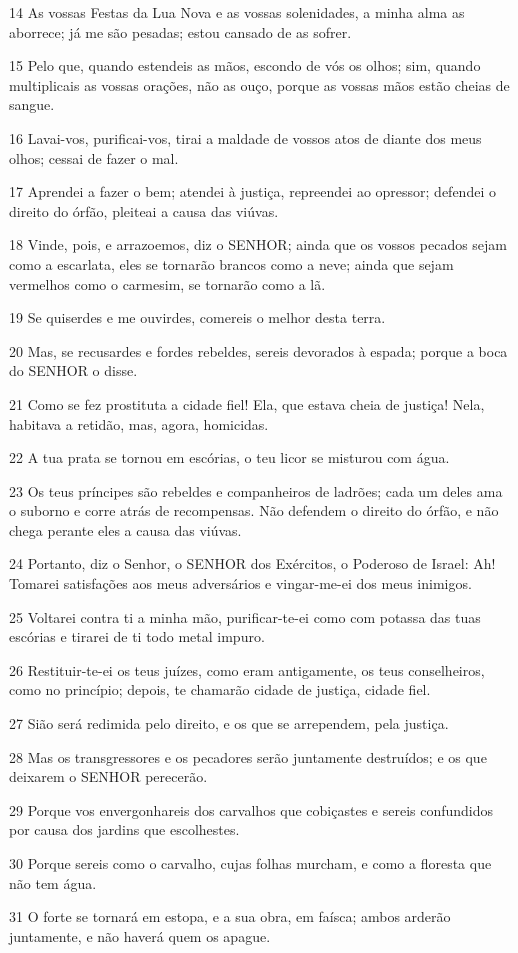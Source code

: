 \par 14 As vossas Festas da Lua Nova e as vossas solenidades, a minha alma as aborrece; já me são pesadas; estou cansado de as sofrer.
\par 15 Pelo que, quando estendeis as mãos, escondo de vós os olhos; sim, quando multiplicais as vossas orações, não as ouço, porque as vossas mãos estão cheias de sangue.
\par 16 Lavai-vos, purificai-vos, tirai a maldade de vossos atos de diante dos meus olhos; cessai de fazer o mal.
\par 17 Aprendei a fazer o bem; atendei à justiça, repreendei ao opressor; defendei o direito do órfão, pleiteai a causa das viúvas.
\par 18 Vinde, pois, e arrazoemos, diz o SENHOR; ainda que os vossos pecados sejam como a escarlata, eles se tornarão brancos como a neve; ainda que sejam vermelhos como o carmesim, se tornarão como a lã.
\par 19 Se quiserdes e me ouvirdes, comereis o melhor desta terra.
\par 20 Mas, se recusardes e fordes rebeldes, sereis devorados à espada; porque a boca do SENHOR o disse.
\par 21 Como se fez prostituta a cidade fiel! Ela, que estava cheia de justiça! Nela, habitava a retidão, mas, agora, homicidas.
\par 22 A tua prata se tornou em escórias, o teu licor se misturou com água.
\par 23 Os teus príncipes são rebeldes e companheiros de ladrões; cada um deles ama o suborno e corre atrás de recompensas. Não defendem o direito do órfão, e não chega perante eles a causa das viúvas.
\par 24 Portanto, diz o Senhor, o SENHOR dos Exércitos, o Poderoso de Israel: Ah! Tomarei satisfações aos meus adversários e vingar-me-ei dos meus inimigos.
\par 25 Voltarei contra ti a minha mão, purificar-te-ei como com potassa das tuas escórias e tirarei de ti todo metal impuro.
\par 26 Restituir-te-ei os teus juízes, como eram antigamente, os teus conselheiros, como no princípio; depois, te chamarão cidade de justiça, cidade fiel.
\par 27 Sião será redimida pelo direito, e os que se arrependem, pela justiça.
\par 28 Mas os transgressores e os pecadores serão juntamente destruídos; e os que deixarem o SENHOR perecerão.
\par 29 Porque vos envergonhareis dos carvalhos que cobiçastes e sereis confundidos por causa dos jardins que escolhestes.
\par 30 Porque sereis como o carvalho, cujas folhas murcham, e como a floresta que não tem água.
\par 31 O forte se tornará em estopa, e a sua obra, em faísca; ambos arderão juntamente, e não haverá quem os apague.

